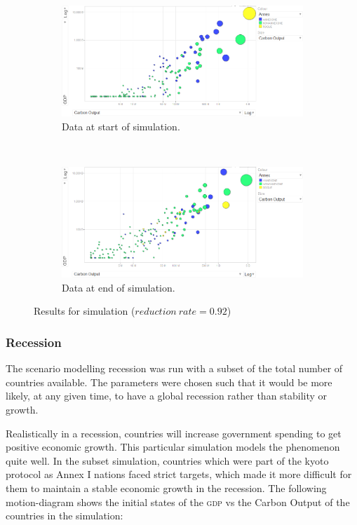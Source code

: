 \begin{figure}[H]
		\centering
        \begin{subfigure}[b]{\textwidth}
                \centering
                \includegraphics[width=\textwidth]{img/simulations/352-reduction-rate-before.png}
				\caption{Data at start of simulation.}
				\label{subfig:352-1}
        \end{subfigure}
        \\
        \begin{subfigure}[b]{\textwidth}
                \centering
                \includegraphics[width=\textwidth]{img/simulations/352-reduction-rate-after.png}
				\caption{Data at end of simulation.}
				\label{subfig:352-2}
        \end{subfigure}
        \caption{Results for simulation ($reduction~rate=0.92$)}\label{fig:352}
\end{figure}

\subsubsection{Recession}
The scenario modelling recession was run with a subset of the total number of countries available. The parameters were chosen such that it would be more likely, at any given time, to have a global recession rather than stability or growth.

Realistically in a recession, countries will increase government spending to get positive economic growth. This particular simulation models the phenomenon quite well. In the subset simulation, countries which were part of the kyoto protocol as Annex I nations faced strict targets, which made it more difficult for them to maintain a stable economic growth in the recession. The following motion-diagram shows the initial states of the \textsc{gdp} vs the Carbon Output of the countries in the simulation:
